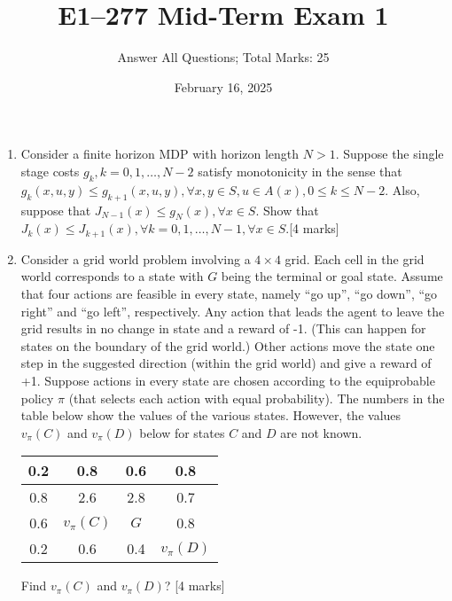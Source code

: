 \documentclass[12pt]{article}
\title{E1--277 Mid-Term Exam 1}
\author{Answer All Questions; Total Marks: 25}
\date{February 16, 2025}
\begin{document}
\maketitle

\begin{enumerate}

  \item
        Consider a finite horizon MDP with horizon length \( N>1 \).
        Suppose the single stage costs \( g_{k}, k=0,1, \ldots, N-2 \) satisfy monotonicity in the sense that \( g_{k}(x, u, y) \leq g_{k+1}(x, u, y), \forall x, y \in S, u \in A(x), 0 \leq k \leq N-2 \).
        Also, suppose that \( J_{N-1}(x) \leq g_{N}(x), \forall x \in S \).
        Show that \( J_{k}(x) \leq J_{k+1}(x), \forall k=0,1, \ldots, N-1, \forall x \in S \).\@ \hfill [4 marks]

  \item
        Consider a grid world problem involving a \( 4 \times 4 \) grid.
        Each cell in the grid world corresponds to a state with \( G \) being the terminal or goal state.
        Assume that four actions are feasible in every state, namely ``go up'', ``go down'', ``go right'' and ``go left'', respectively.
        Any action that leads the agent to leave the grid results in no change in state and a reward of -1.
        (This can happen for states on the boundary of the grid world.)
        Other actions move the state one step in the suggested direction (within the grid world) and give a reward of +1.
        Suppose actions in every state are chosen according to the equiprobable policy \( \pi \) (that selects each action with equal probability).
        The numbers in the table below show the values of the various states.
        However, the values \( v_{\pi}(C) \) and \( v_{\pi}(D) \) below for states \( C \) and \( D \) are not known.
        \begin{center}
          \begin{tabular}{|c|c|c|c|}
            \hline
            0.2 & 0.8              & 0.6     & 0.8              \\
            \hline
            0.8 & 2.6              & 2.8     & 0.7              \\
            \hline
            0.6 & \( v_{\pi}(C) \) & \( G \) & 0.8              \\
            \hline
            0.2 & 0.6              & 0.4     & \( v_{\pi}(D) \) \\
            \hline
          \end{tabular}
        \end{center}
        Find \( v_{\pi}(C) \) and \( v_{\pi}(D) \)?
        \hfill [4 marks]


\end{enumerate}
\end{document}

